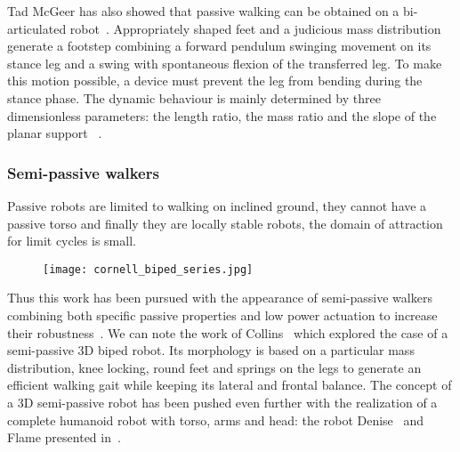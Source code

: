 Tad McGeer has also showed that passive walking can be obtained on a bi-articulated robot~\parencite{mcgeer1992principles}. Appropriately shaped feet  and a judicious mass distribution generate a footstep combining a forward pendulum swinging movement on its stance leg and a swing with spontaneous flexion of the transferred leg. To make this motion possible, a device must prevent the leg from bending during the stance phase.
The dynamic behaviour is mainly determined by three dimensionless parameters: the length ratio, the mass ratio and the slope of the planar support ~\parencite{Garcia1998}.


\subsubsection{Semi-passive walkers} %
Passive robots are limited to walking on inclined ground, they cannot have a passive torso and finally they are locally stable robots, the domain of attraction for limit cycles is small.

\begin{figure}[tb]
    \begin{center}
        \texttt{[image: cornell\_biped\_series.jpg]}
    \end{center}
    \caption{}
    \label{fig:cornell-biped}
\end{figure}

Thus this work has been pursued with the appearance of semi-passive walkers combining both specific passive properties and low power actuation to increase their robustness~\parencite{Anderson2005}. We can note the work of Collins~\parencite{collins2005bipedal} which explored the case of a semi-passive 3D biped robot. Its morphology is based on a particular mass distribution, knee locking, round feet and springs on the legs to generate an efficient walking gait while keeping its lateral and frontal balance. The concept of a 3D semi-passive robot has been pushed even further with the realization of a complete humanoid robot with torso, arms and head: the robot Denise~\parencite{wisse2005three} and Flame presented in~\parencite{Hobbelen2008}.

%


